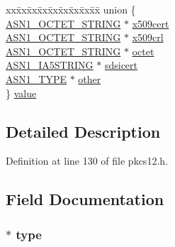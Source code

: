 \begin{DoxyCompactItemize}
\begin{tabbing}
\end{tabbing}\item 
\begin{tabbing}
xx\=xx\=xx\=xx\=xx\=xx\=xx\=xx\=xx\=\kill
union \{\\
\>\hyperlink{crypto_2ossl__typ_8h_afbd05e94e0f0430a2b729473efec88c1}{ASN1\_OCTET\_STRING} $\ast$ \hyperlink{structpkcs12__bag__st_a47d0075681e2e6a2edae0ddbdba78c27}{x509cert}\\
\>\hyperlink{crypto_2ossl__typ_8h_afbd05e94e0f0430a2b729473efec88c1}{ASN1\_OCTET\_STRING} $\ast$ \hyperlink{structpkcs12__bag__st_a18c3abd240dba9e08282b8d0a003fabc}{x509crl}\\
\>\hyperlink{crypto_2ossl__typ_8h_afbd05e94e0f0430a2b729473efec88c1}{ASN1\_OCTET\_STRING} $\ast$ \hyperlink{structpkcs12__bag__st_a8b4bb4f6f16ce77af5290cc2955d9261}{octet}\\
\>\hyperlink{crypto_2ossl__typ_8h_a0d915c339a64c1c9871d5404e51c44fd}{ASN1\_IA5STRING} $\ast$ \hyperlink{structpkcs12__bag__st_a125c3c5ae7f1fa905d64b3eac36c53a4}{sdsicert}\\
\>\hyperlink{crypto_2asn1_2asn1_8h_a7895e03d9fee2bc4963faf2a31a9439e}{ASN1\_TYPE} $\ast$ \hyperlink{structpkcs12__bag__st_a913b5f8be6ebbc8d847d25c9279ee3d2}{other}\\
\} \hyperlink{structpkcs12__bag__st_aff15caec5e8dcb53235e51f3e74ee103}{value}\\

\end{tabbing}\end{DoxyCompactItemize}


\subsection{Detailed Description}


Definition at line 130 of file pkcs12.\+h.



\subsection{Field Documentation}
\subsubsection[{\texorpdfstring{type}{type}}]{ $\ast$ type}\hypertarget{structpkcs12__bag__st_a208650820ad37e29d3433d9f20665c28}{}\label{structpkcs12__bag__st_a208650820ad37e29d3433d9f20665c28}


